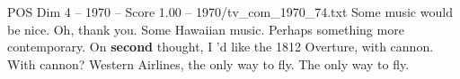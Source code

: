 \begin{textsample}{POS Dim 4 – 1970 – Score 1.00 – 1970/tv\_com\_1970\_74.txt}  \label{ex:f4_pos_040}
Some music would be nice.
Oh, thank you.
Some Hawaiian music.
Perhaps something more contemporary.
On \textbf{second} thought, I 'd like the 1812 Overture, with cannon.
With cannon?
Western Airlines, the only way to fly.
The only way to fly.

\end{textsample}
